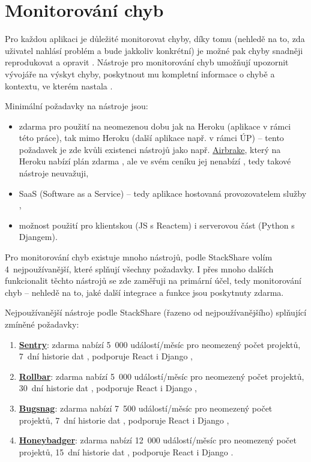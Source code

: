 \section{Monitorování chyb}\label{sec:monitorovanichyb}
Pro každou aplikaci je důležité monitorovat chyby, díky tomu (nehledě na to, zda uživatel nahlásí problém a bude jakkoliv konkrétní) je možné pak chyby snadněji reprodukovat a opravit \cite{tools-exception}. Nástroje pro monitorování chyb umožňují upozornit vývojáře na výskyt chyby, poskytnout mu kompletní informace o chybě a kontextu, ve kterém nastala \cite{tools-exception}.

Minimální požadavky na nástroje jsou:
\begin{itemize}
    \item zdarma pro použití na neomezenou dobu jak na Heroku (aplikace v rámci této práce), tak mimo Heroku (další aplikace např. v rámci ÚP) -- tento požadavek je zde kvůli existenci nástrojů jako např. \href{https://airbrake.io/}{Airbrake}, který na Heroku nabízí plán zdarma \cite{airbrake-heroku}, ale ve svém ceníku jej nenabízí \cite{airbrake-pricing}, tedy takové nástroje neuvažuji,
    \item SaaS (Software as a Service) -- tedy aplikace hostovaná provozovatelem služby \cite{oracle-saas},
    \item možnost použití pro klientskou (JS s Reactem) i serverovou část (Python s Djangem).
\end{itemize}

Pro monitorování chyb existuje mnoho nástrojů, podle StackShare \cite{stackshare-exception} volím 4~nejpoužívanější, které splňují všechny požadavky. I přes mnoho dalších funkcionalit těchto nástrojů se zde zaměřuji na primární účel, tedy monitorování chyb -- nehledě na to, jaké další integrace a funkce jsou poskytnuty zdarma.

Nejpoužívanější nástroje podle StackShare (řazeno od nejpoužívanějšího) \cite{stackshare-exception} splňující zmíněné požadavky:
\begin{enumerate}
    \item \href{https://sentry.io/}{\textbf{Sentry}}: zdarma nabízí 5~000 událostí/měsíc pro neomezený počet projektů, 7~dní historie dat \cite{sentry-pricing}, podporuje React i Django \cite{sentry-platforms},
    \item \href{https://rollbar.com/}{\textbf{Rollbar}}: zdarma nabízí 5~000 událostí/měsíc pro neomezený počet projektů, 30~dní historie dat \cite{rollbar-pricing}, podporuje React i Django \cite{rollbar-platforms},
    \item \href{https://www.bugsnag.com/}{\textbf{Bugsnag}}: zdarma nabízí 7~500 událostí/měsíc pro neomezený počet projektů, 7~dní historie dat \cite{bugsnag-pricing}, podporuje React i Django \cite{bugsnag-platforms},
    \item \href{https://www.honeybadger.io/}{\textbf{Honeybadger}}: zdarma nabízí 12~000 událostí/měsíc pro neomezený počet projektů, 15~dní historie dat \cite{honeybadger-pricing}, podporuje React \cite{honeybadger-react} i Django \cite{honeybadger-django}.
\end{enumerate}

